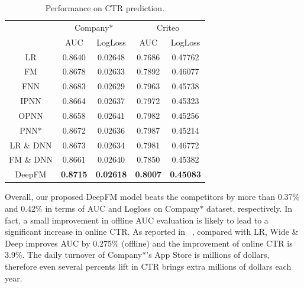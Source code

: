 \begin{table}[ht]
\centering
\footnotesize
\caption{\footnotesize{Performance on CTR prediction.}}\label{table:performance}
\begin{tabular}{|c|c|c|c|c|}
\hline
\multirow{2}{*}{} & \multicolumn{2}{c|}{Company$\ast$} & \multicolumn{2}{c|}{Criteo} \\
 \cline{2-5}
 & AUC & LogLoss & AUC & LogLoss\\ \hline
LR      & 0.8640    & 0.02648   & 0.7686 & 0.47762\\ \hline
FM      & 0.8678    & 0.02633   & 0.7892 & 0.46077\\ \hline
FNN     & 0.8683    & 0.02629   & 0.7963 & 0.45738\\ \hline
IPNN    & 0.8664    & 0.02637   & 0.7972 & 0.45323\\ \hline
OPNN    & 0.8658    & 0.02641   & 0.7982 & 0.45256\\ \hline
PNN$\ast$    & 0.8672    & 0.02636   & 0.7987 & 0.45214\\ \hline
LR \& DNN & 0.8673    & 0.02634   & 0.7981 & 0.46772\\ \hline
FM \& DNN & 0.8661    & 0.02640   & 0.7850 & 0.45382\\ \hline
DeepFM  & \textbf{0.8715}    &  \textbf{0.02618}  & \textbf{0.8007} & \textbf{0.45083}\\ \hline
\end{tabular}
\end{table}




Overall, our proposed DeepFM model beats the competitors by more than 0.37\% and 0.42\% in terms of AUC and Logloss on Company$\ast$ dataset, respectively. In fact, a small improvement in offline AUC evaluation is likely to lead to a significant increase in online CTR. As reported in ~\cite{wide-n-deep}, compared with LR, Wide \& Deep improves AUC by 0.275\% (offline) and the improvement of online CTR is 3.9\%. The daily turnover of Company$\ast$'s App Store is millions of dollars, therefore even several percents lift in CTR brings extra millions of dollars each year.

